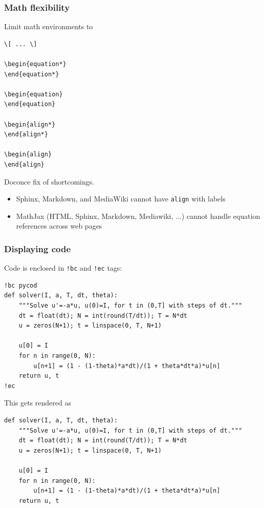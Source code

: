 \documentclass{beamer}
\newenvironment{graybox1admon}[1][]{\begin{block}{#1}}{\end{block}}
\begin{document}
\begin{frame}
\frametitle{Math flexibility}

Limit math environments to

\begin{Verbatim}[numbers=none,fontsize=\fontsize{9pt}{9pt},baselinestretch=0.95]
\[ ... \]

\begin{equation*}
\end{equation*}

\begin{equation}
\end{equation}

\begin{align*}
\end{align*}

\begin{align}
\end{align}
\end{Verbatim}


\begin{graybox1admon}[Doconce fix of shortcomings.]
\begin{itemize}
 \item Sphinx, Markdown, and MediaWiki cannot have
   \Verb!align! with labels

 \item MathJax (HTML, Sphinx, Markdown, Mediawiki, ...) cannot
   handle equation references across web pages
\end{itemize}

\noindent
\end{graybox1admon}
\end{frame}

\begin{frame}
\frametitle{Displaying code}

Code is enclosed in \Verb~!bc~ and \Verb~!ec~ tags:

\begin{Verbatim}[numbers=none,fontsize=\fontsize{9pt}{9pt},baselinestretch=0.95]
!bc pycod
def solver(I, a, T, dt, theta):
    """Solve u'=-a*u, u(0)=I, for t in (0,T] with steps of dt."""
    dt = float(dt); N = int(round(T/dt)); T = N*dt
    u = zeros(N+1); t = linspace(0, T, N+1)

    u[0] = I
    for n in range(0, N):
        u[n+1] = (1 - (1-theta)*a*dt)/(1 + theta*dt*a)*u[n]
    return u, t
!ec
\end{Verbatim}
This gets rendered as

\begin{verbatim}
def solver(I, a, T, dt, theta):
    """Solve u'=-a*u, u(0)=I, for t in (0,T] with steps of dt."""
    dt = float(dt); N = int(round(T/dt)); T = N*dt
    u = zeros(N+1); t = linspace(0, T, N+1)

    u[0] = I
    for n in range(0, N):
        u[n+1] = (1 - (1-theta)*a*dt)/(1 + theta*dt*a)*u[n]
    return u, t
\end{verbatim}
\end{frame}
\end{document}
